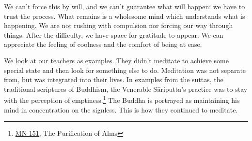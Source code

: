 We can't force this by will, and we can't guarantee what will happen: we
have to trust the process. What remains is a wholesome mind which
understands what is happening. We are not rushing with compulsion nor
forcing our way through things. After the difficulty, we have space for
gratitude to appear. We can appreciate the feeling of coolness and the
comfort of being at ease.


We look at our teachers as examples. They didn't meditate to achieve
some special state and then look for something else to do. Meditation
was not separate from, but was integrated into their lives. In examples
from the suttas, the traditional scriptures of Buddhism, the Venerable
Sāriputta's practice was to stay with the perception of
emptiness.\footnote{\href{https://suttacentral.net/mn151}{MN 151}, The
  Purification of Alms} The Buddha is portrayed as maintaining his mind
in concentration on the signless. This is how they continued to
meditate.
